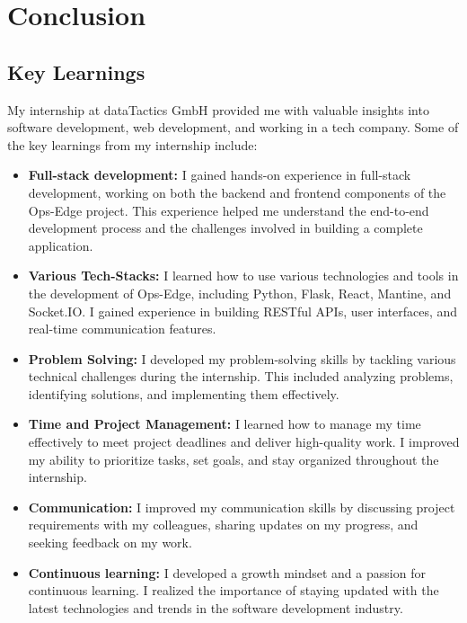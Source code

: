 \chapter{Conclusion}
\label{ch:conclusion}

%
%

\section{Key Learnings}
\label{sec:conclusion:key_learnings}

My internship at dataTactics GmbH provided me with valuable insights into software development, web development, and working in a tech company. Some of the key learnings from my internship include:

\begin{itemize}
    \item \textbf{Full-stack development:} I gained hands-on experience in full-stack development, working on both the backend and frontend components of the Ops-Edge project. This experience helped me understand the end-to-end development process and the challenges involved in building a complete application.
    \item \textbf{Various Tech-Stacks:} I learned how to use various technologies and tools in the development of Ops-Edge, including Python, Flask, React, Mantine, and Socket.IO\@. I gained experience in building RESTful APIs, user interfaces, and real-time communication features.
    \item \textbf{Problem Solving:} I developed my problem-solving skills by tackling various technical challenges during the internship. This included analyzing problems, identifying solutions, and implementing them effectively.
    \item \textbf{Time and Project Management:} I learned how to manage my time effectively to meet project deadlines and deliver high-quality work. I improved my ability to prioritize tasks, set goals, and stay organized throughout the internship.
    \item \textbf{Communication:} I improved my communication skills by discussing project requirements with my colleagues, sharing updates on my progress, and seeking feedback on my work.
    \item \textbf{Continuous learning:} I developed a growth mindset and a passion for continuous learning. I realized the importance of staying updated with the latest technologies and trends in the software development industry.
\end{itemize}

